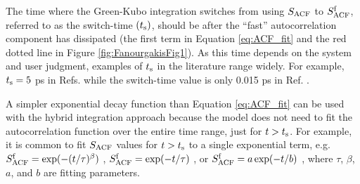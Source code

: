 \documentclass[9pt,bestpractices]{livecoms}
\begin{document}
The time where the Green-Kubo integration switches from using $S_{\rm ACF}$ to $S^{\rm f}_{\rm ACF}$, referred to as the switch-time $(t_{\rm s})$, should be after the ``fast'' autocorrelation component has dissipated (the first term in Equation \ref{eq:ACF_fit} and the red dotted line in Figure \ref{fig:FanourgakisFig1}). As this time depends on the system and user judgment, examples of $t_{\rm s}$ in the literature range widely. For example, $t_{\rm s} = 5$ ps in Refs. \cite{vanderSpoel1998,Shirts2013} while the switch-time value is only 0.015 ps in Ref. \cite{Fernandez2005}.  

A simpler exponential decay function than Equation \ref{eq:ACF_fit} can be used with the hybrid integration approach because the model does not need to fit the autocorrelation function over the entire time range, just for $t > t_{\rm s}$. For example, it is common to fit $S_{\rm ACF}$ values for $t > t_{\rm s}$ to a single exponential term, e.g. $S^{\rm f}_{\rm ACF} = \exp(-(t/\tau)^\beta)$ \cite{vanderSpoel1998}, $S^{\rm f}_{\rm ACF} = \exp(-t/\tau)$ \cite{Shirts2013}, or $S^{\rm f}_{\rm ACF} = a \exp(-t/b)$ \cite{Fernandez2005}, where $\tau$, $\beta$, $a$, and $b$ are fitting parameters. 



\end{document}
